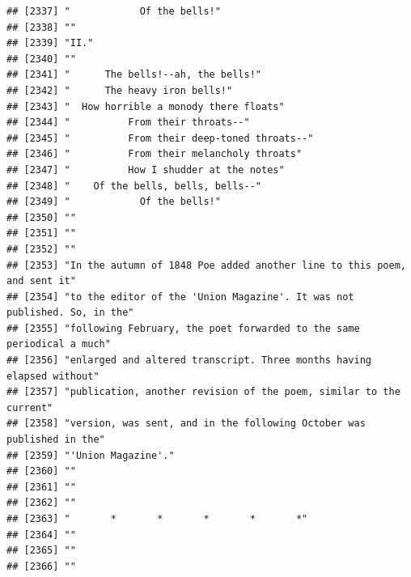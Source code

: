 \documentclass{article}\usepackage[]{graphicx}\usepackage[]{color}
\makeatletter
\newenvironment{kframe}{%
 \def\at@end@of@kframe{}%
 \ifinner\ifhmode%
  \def\at@end@of@kframe{\end{minipage}}%
  \begin{minipage}{\columnwidth}%
 \fi\fi%
 \def\FrameCommand##1{\hskip\@totalleftmargin \hskip-\fboxsep
 \colorbox{shadecolor}{##1}\hskip-\fboxsep
     \hskip-\linewidth \hskip-\@totalleftmargin \hskip\columnwidth}%
 \MakeFramed {\advance\hsize-\width
   \@totalleftmargin\z@ \linewidth\hsize
   \@setminipage}}%
 {\par\unskip\endMakeFramed%
 \at@end@of@kframe}
\newenvironment{knitrout}{}{} %
\makeatother
\begin{document}
\begin{knitrout}
\begin{kframe}
\begin{verbatim}
## [2337] "            Of the bells!"                                                   
## [2338] ""                                                                            
## [2339] "II."                                                                         
## [2340] ""                                                                            
## [2341] "      The bells!--ah, the bells!"                                            
## [2342] "      The heavy iron bells!"                                                 
## [2343] "  How horrible a monody there floats"                                        
## [2344] "          From their throats--"                                              
## [2345] "          From their deep-toned throats--"                                   
## [2346] "          From their melancholy throats"                                     
## [2347] "          How I shudder at the notes"                                        
## [2348] "    Of the bells, bells, bells--"                                            
## [2349] "            Of the bells!"                                                   
## [2350] ""                                                                            
## [2351] ""                                                                            
## [2352] ""                                                                            
## [2353] "In the autumn of 1848 Poe added another line to this poem, and sent it"      
## [2354] "to the editor of the 'Union Magazine'. It was not published. So, in the"     
## [2355] "following February, the poet forwarded to the same periodical a much"        
## [2356] "enlarged and altered transcript. Three months having elapsed without"        
## [2357] "publication, another revision of the poem, similar to the current"           
## [2358] "version, was sent, and in the following October was published in the"        
## [2359] "'Union Magazine'."                                                           
## [2360] ""                                                                            
## [2361] ""                                                                            
## [2362] ""                                                                            
## [2363] "       *       *       *       *       *"                                    
## [2364] ""                                                                            
## [2365] ""                                                                            
## [2366] ""                                                                            

\end{verbatim}
\end{kframe}
\end{knitrout}
\end{document}
